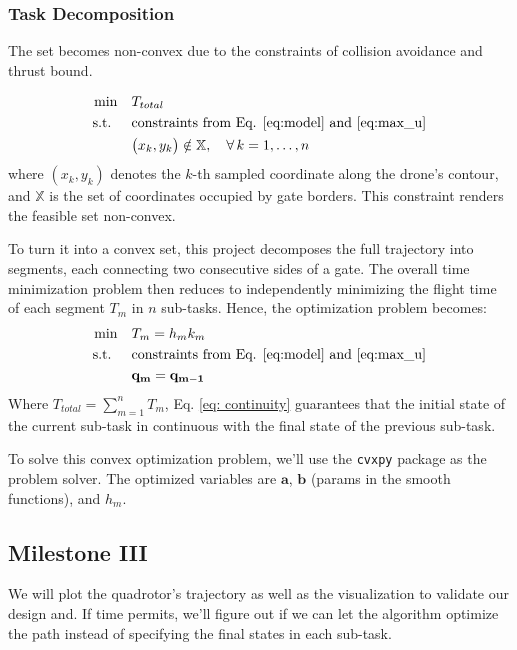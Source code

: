 \documentclass[conference]{IEEEtran}
\begin{document}
\subsubsection*{Task Decomposition}
The set becomes non-convex due to the constraints of collision avoidance and thrust bound.

\begin{align*}
    \min \quad& T_{total}\\
    \text{s.t. }\quad& \text{constraints from Eq. \ref{eq:model} and \ref{eq:max_u}}\\
    & \bigl(x_k, y_k\bigr) \notin \mathbb{X}, \quad \forall\, k = 1, \dots, n
\end{align*}
where $(x_k, y_k)$ denotes the $k$-th sampled coordinate along the drone's contour, and $\mathbb{X}$ is the set of coordinates occupied by gate borders. This constraint renders the feasible set non-convex.

To turn it into a convex set, this project decomposes the full trajectory into segments, each connecting two consecutive sides of a gate. The overall time minimization problem then reduces to independently minimizing the flight time of each segment $T_m$ in $n$ sub-tasks. Hence, the optimization problem becomes:
\begin{align}
    \min \quad & T_m = h_m k_m \\
    \text{s.t. }\quad &\text{constraints from Eq. \ref{eq:model} and \ref{eq:max_u}} \nonumber \\    
    & \mathbf{q_{m}} = \mathbf{q_{m-1}} \label{eq: continuity}
\end{align}
Where $T_{total} = \sum_{m=1}^{n} T_m$, Eq. \ref{eq: continuity} guarantees that the initial state of the current sub-task in continuous with the final state of the previous sub-task.

To solve this convex optimization problem, we'll use the \texttt{cvxpy} package as the problem solver. The optimized variables are $\mathbf{a}$, $\mathbf{b}$ (params in the smooth functions), and $h_m$.

\subsection*{Milestone III}
We will plot the quadrotor's trajectory as well as the visualization to validate our design and. If time permits, we'll figure out if we can let the algorithm optimize the path instead of specifying the final states in each sub-task.
\end{document}
